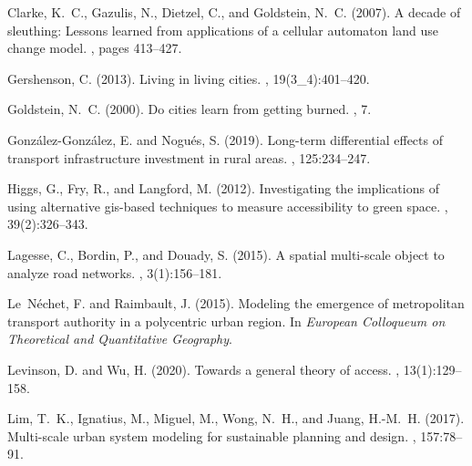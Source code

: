 \documentclass[letterpaper]{article}
\begin{document}
\begin{thebibliography}{}
Clarke, K.~C., Gazulis, N., Dietzel, C., and Goldstein, N.~C. (2007).
\newblock A decade of sleuthing: Lessons learned from applications of a
  cellular automaton land use change model.
, pages 413--427.

Gershenson, C. (2013).
\newblock Living in living cities.
, 19(3\_4):401--420.

Goldstein, N.~C. (2000).
\newblock Do cities learn from getting burned.
, 7.

Gonz{\'a}lez-Gonz{\'a}lez, E. and Nogu{\'e}s, S. (2019).
\newblock Long-term differential effects of transport infrastructure investment
  in rural areas.
,
  125:234--247.

Higgs, G., Fry, R., and Langford, M. (2012).
\newblock Investigating the implications of using alternative gis-based
  techniques to measure accessibility to green space.
,
  39(2):326--343.

Lagesse, C., Bordin, P., and Douady, S. (2015).
\newblock A spatial multi-scale object to analyze road networks.
, 3(1):156--181.

Le~N{\'e}chet, F. and Raimbault, J. (2015).
\newblock Modeling the emergence of metropolitan transport authority in a
  polycentric urban region.
\newblock In {\em European Colloqueum on Theoretical and Quantitative
  Geography}.

Levinson, D. and Wu, H. (2020).
\newblock Towards a general theory of access.
, 13(1):129--158.

Lim, T.~K., Ignatius, M., Miguel, M., Wong, N.~H., and Juang, H.-M.~H. (2017).
\newblock Multi-scale urban system modeling for sustainable planning and
  design.
, 157:78--91.


\end{thebibliography}
\end{document}
